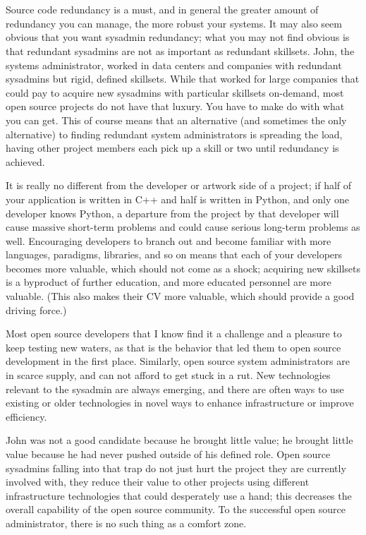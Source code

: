 \section*{}Source code redundancy is a must, and in general the greater amount of
redundancy you can manage, the more robust your systems. It may also seem
obvious that you want sysadmin redundancy; what you may not find obvious is that
redundant sysadmins are not as important as redundant skillsets. John, the
systems administrator, worked in data centers and companies with redundant
sysadmins but rigid, defined skillsets. While that worked for large companies
that could pay to acquire new sysadmins with particular skillsets on-demand,
most open source projects do not have that luxury. You have to make do with what
you can get. This of course means that an alternative (and sometimes the only
alternative) to finding redundant system administrators is spreading the load,
having other project members each pick up a skill or two until redundancy is
achieved.

It is really no different from the developer or artwork side of a project; if half of
your application is written in C++ and half is written in Python, and only one
developer knows Python, a departure from the project by that developer will
cause massive short-term problems and could cause serious long-term problems as
well. Encouraging developers to branch out and become familiar with more
languages, paradigms, libraries, and so on means that each of your developers
becomes more valuable, which should not come as a shock; acquiring new skillsets
is a byproduct of further education, and more educated personnel are more
valuable. (This also makes their CV more valuable, which should provide a good driving force.)

Most open source developers that I know find it a challenge and a pleasure to
keep testing new waters, as that is the behavior that led them to open source
development in the first place. Similarly, open source system administrators are
in scarce supply, and can not afford to get stuck in a rut. New technologies
relevant to the sysadmin are always emerging, and there are often ways to use
existing or older technologies in novel ways to enhance infrastructure or
improve efficiency.

John was not a good candidate because he brought little value; he brought little
value because he had never pushed outside of his defined role. Open source
sysadmins falling into that trap do not just hurt the project they are currently
involved with, they reduce their value to other projects using different
infrastructure technologies that could desperately use a hand; this decreases
the overall capability of the open source community. To the successful open
source administrator, there is no such thing as a comfort zone.
